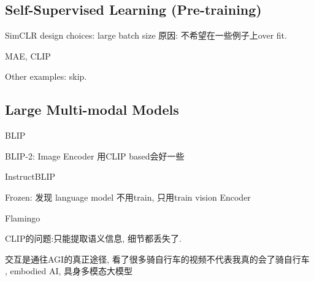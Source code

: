 \subsection{Self-Supervised Learning (Pre-training)}

SimCLR design choices: large batch size 原因: 不希望在一些例子上over fit.

MAE, CLIP

Other examples: skip.

\subsection{Large Multi-modal Models}

BLIP

BLIP-2: Image Encoder 用CLIP based会好一些

InstructBLIP

Frozen: 发现 language model 不用train, 只用train vision Encoder

Flamingo

CLIP的问题:只能提取语义信息, 细节都丢失了.

交互是通往AGI的真正途径, 看了很多骑自行车的视频不代表我真的会了骑自行车
, embodied AI, 具身多模态大模型